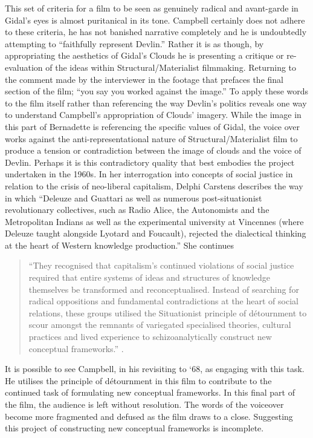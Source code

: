 \documentclass[12pt]{article}
\begin{document}
This set of criteria for a film to be seen as genuinely radical and avant-garde in Gidal's eyes is almost puritanical in its tone. Campbell certainly does not adhere to these criteria, he has not banished narrative completely and he is undoubtedly attempting to ``faithfully represent Devlin.'' Rather it is as though, by appropriating the aesthetics of Gidal's Clouds he is presenting a critique or re-evaluation of the ideas within Structural/Materialist filmmaking. Returning to the comment made by the interviewer in the footage that prefaces the final section of the film;  ``you say you worked against the image.'' To apply these words to the film itself rather than referencing the way Devlin's politics reveals one way to understand Campbell's appropriation of Clouds' imagery. While the image in this part of Bernadette is referencing the specific values of Gidal, the voice over works against the anti-representational nature of Structural/Materialist film to produce a tension or contradiction between the image of clouds and the voice of Devlin. Perhaps it is this contradictory quality that best embodies the project undertaken in the 1960s. In her interrogation into concepts of social justice in relation to the crisis of neo-liberal capitalism, Delphi Carstens describes the way in which ``Deleuze and Guattari as well as numerous post-situationist revolutionary collectives, such as Radio Alice, the Autonomists and the Metropolitan Indians as well as the experimental university at Vincennes (where Deleuze taught alongside Lyotard and Foucault), rejected the dialectical thinking at the heart of Western knowledge production.'' She continues 

\begin{quote}
``They recognised that capitalism's continued violations of social justice required that entire systems of ideas and structures of knowledge themselves be transformed and reconceptualised. Instead of searching for radical oppositions and fundamental contradictions at the heart of social relations, these groups utilised the Situationist principle of d\'{e}tournment to scour amongst the remnants of variegated specialised theories, cultural practices and lived experience to schizoanalytically construct new conceptual frameworks.'' \cite{Carstens:2017aa}.
\end{quote}

It is possible to see Campbell, in his revisiting to `68, as engaging with this task. He utilises the principle of d\'{e}tournment in this film to contribute to the continued task of formulating new conceptual frameworks. In this final part of the film, the audience is left without resolution. The words of the voiceover become more fragmented and defused as the film draws to a close. Suggesting this project of constructing new conceptual frameworks is incomplete. 
\end{document}
